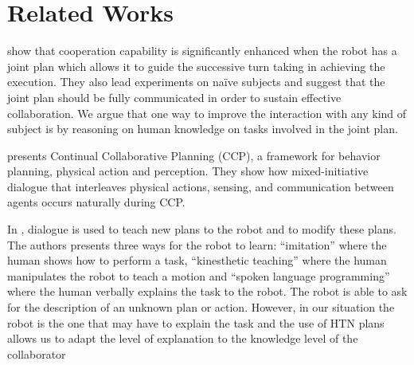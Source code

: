 \documentclass{llncs}
\begin{document}


\section{Related Works}





\cite{Lallee2013} show that cooperation capability is significantly enhanced when the robot has a joint plan which allows it to guide the successive turn taking in achieving the execution. They also lead experiments on na\"ive subjects and suggest that the joint plan should be fully communicated in order to sustain effective collaboration. We argue that one way to improve the interaction with any kind of subject is by reasoning on human knowledge on tasks involved in the joint plan.

\cite{Brenner2008} presents Continual Collaborative Planning (CCP), a framework for behavior planning, physical action and perception. They show how mixed-initiative dialogue that interleaves physical  actions,  sensing,  and  communication  between
agents occurs naturally during CCP.

In \cite{Petit2012}, dialogue is used to teach new plans to the robot and to modify these plans. The authors presents three ways for the robot to learn: ``imitation'' where the human shows how to perform a task, ``kinesthetic teaching'' where the human manipulates the robot to teach a motion and ``spoken language programming'' where the human verbally explains the task to the robot. The robot is able to ask for the description of an unknown plan or action. However, in our situation the robot is the one that may have to explain the task and the use of HTN plans allows us to adapt the level of explanation to the knowledge level of the collaborator

\end{document}
